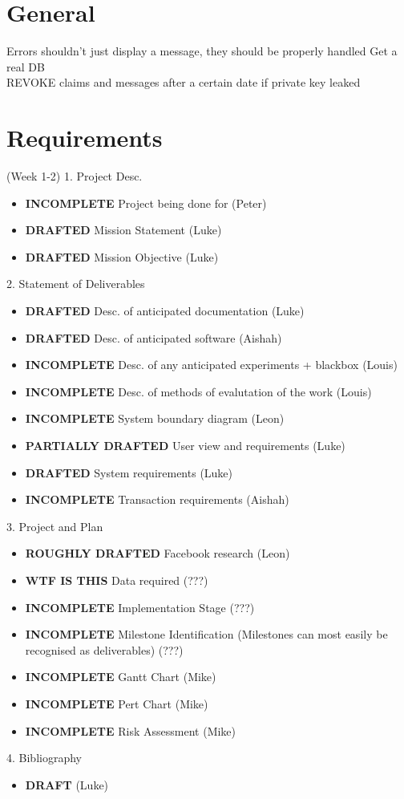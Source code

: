 \section{General}
Errors shouldn't just display a message, they should be properly handled
Get a real DB\\
REVOKE claims and messages after a certain date if private key leaked\\

\section{Requirements} (Week 1-2)
1. Project Desc.
\begin{itemize}
\item \textbf{INCOMPLETE} Project being done for (Peter)
\item \textbf{DRAFTED} Mission Statement (Luke)
\item \textbf{DRAFTED} Mission Objective (Luke)
\end{itemize}

2. Statement of Deliverables
\begin{itemize}
\item \textbf{DRAFTED} Desc. of anticipated documentation (Luke)
\item \textbf{DRAFTED} Desc. of anticipated software (Aishah)
\item \textbf{INCOMPLETE} Desc. of any anticipated experiments + blackbox (Louis)
\item \textbf{INCOMPLETE} Desc. of methods of evalutation of the work (Louis)
\item \textbf{INCOMPLETE} System boundary diagram (Leon)
\item \textbf{PARTIALLY DRAFTED} User view and requirements (Luke)
\item \textbf{DRAFTED} System requirements (Luke)
\item \textbf{INCOMPLETE} Transaction requirements (Aishah)
\end{itemize}

3. Project and Plan
\begin{itemize}
\item \textbf{ROUGHLY DRAFTED} Facebook research (Leon)
\item \textbf{WTF IS THIS} Data required (???)
\item \textbf{INCOMPLETE} Implementation Stage (???)
\item \textbf{INCOMPLETE} Milestone Identification (Milestones can most easily be recognised as deliverables) (???)
\item \textbf{INCOMPLETE} Gantt Chart (Mike)
\item \textbf{INCOMPLETE} Pert Chart (Mike)
\item \textbf{INCOMPLETE} Risk Assessment (Mike)
\end{itemize}

4. Bibliography
\begin{itemize}
\item \textbf{DRAFT} (Luke)
\end{itemize}
